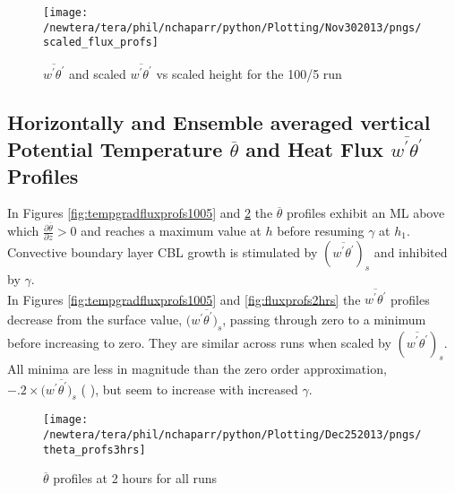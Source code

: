 \begin{figure}[htbp]
    \centering
    \texttt{[image: /newtera/tera/phil/nchaparr/python/Plotting/Nov302013/pngs/scaled\_flux\_profs]}
    \caption[$\overline{w^{'}\theta^{'}}$ scaled by $(\overline{w^{'}\theta^{'}})_{s}$]{$\overline{w^{'}\theta^{'}}$ and scaled $\overline{w^{'}\theta^{'}}$  vs scaled height for the 100/5 run}
    \label{fig:scaledfluxprofs15010}   %
\end{figure}

\clearpage

\subsection{Horizontally and Ensemble averaged vertical Potential Temperature $\overline{\theta}$ 
and Heat Flux $\overline{w^{'}\theta^{'}}$ Profiles}
\FloatBarrier

In Figures \ref{fig:tempgradfluxprofs1005} and \ref{fig:pottempprofs2hrs} the $\overline{\theta}$ profiles exhibit an \acs{ML} above which  $\frac{\partial\overline{\theta}}{\partial z}>0$ 
and reaches a maximum value at $h$ before resuming $\gamma$  at $h_{1}$.  Convective boundary layer \acs{CBL} growth is stimulated by $(\overline{w^{'}\theta^{'}})_{s}$ and inhibited by $\gamma$.\\

In Figures \ref{fig:tempgradfluxprofs1005} and  \ref{fig:fluxprofs2hrs} the $\overline{w^{'}\theta^{'}}$ profiles decrease from the surface value, $(\overline{w^{'}\theta^{'})_{s}}$, passing through zero to a minimum before increasing to zero.  They are similar across runs when scaled by $(\overline{w^{'}\theta^{'}})_{s}$. All minima are less  in magnitude than the zero order approximation, $-.2 \times (\overline{w^{'}\theta^{'})_{s}}$ (\citeauthor{Tennekes73} \citeyear{Tennekes73}), but seem to increase with increased $\gamma$.\\


\begin{figure}[htbp]
    \centering
    \texttt{[image: /newtera/tera/phil/nchaparr/python/Plotting/Dec252013/pngs/theta\_profs3hrs]}
    \caption{$\overline{\theta}$ profiles at 2 hours for all runs}
    \label{fig:pottempprofs2hrs}   %
\end{figure}

